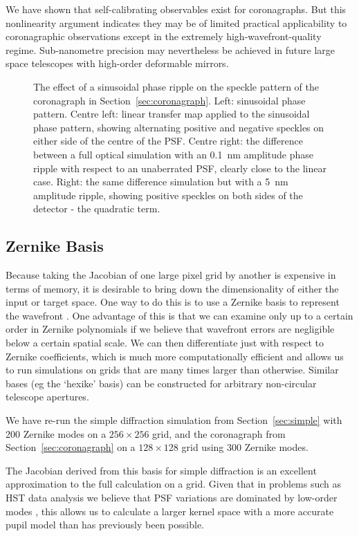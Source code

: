 \documentclass[modern]{aastex63}
\begin{document}
We have shown that self-calibrating observables exist for coronagraphs. But this nonlinearity argument indicates they may be of limited practical applicability to coronagraphic observations except in the extremely high-wavefront-quality regime. Sub-nanometre precision may nevertheless be achieved in future large space telescopes with high-order deformable mirrors.


\begin{figure}
\caption{The effect of a sinusoidal phase ripple on the speckle pattern of the coronagraph in Section~\ref{sec:coronagraph}. Left: sinusoidal phase pattern. Centre left: linear transfer map applied to the sinusoidal phase pattern, showing alternating positive and negative speckles on either side of the centre of the PSF. Centre right: the difference between a full optical simulation with an 0.1~nm amplitude phase ripple with respect to an unaberrated PSF, clearly close to the linear case. Right: the same difference simulation but with a 5~nm amplitude ripple, showing positive speckles on both sides of the detector - the quadratic term. \label{corona_nonlinearity}}
\end{figure}

\subsection{Zernike Basis}
\label{zernike}

Because taking the Jacobian of one large pixel grid by another is expensive in terms of memory, it is desirable to bring down the dimensionality of either the input or target space. One way to do this is to use a Zernike basis to represent the wavefront \citep{zernike34}. One advantage of this is that we can examine only up to a certain order in Zernike polynomials if we believe that wavefront errors are negligible below a certain spatial scale. We can then differentiate just with respect to Zernike coefficients, which is much more computationally efficient and allows us to run simulations on grids that are many times larger than otherwise. Similar bases (eg the `hexike' basis) can be constructed for arbitrary non-circular telescope apertures.

We have re-run the simple diffraction simulation from Section~\ref{sec:simple} with 200 Zernike modes on a $256\times256$ grid, and the coronagraph from Section~\ref{sec:coronagraph} on a $128\times128$ grid using 300 Zernike modes. 

The Jacobian derived from this basis for simple diffraction is an excellent approximation to the full calculation on a grid. Given that in problems such as HST data analysis we believe that PSF variations are dominated by low-order modes \citep{pope13}, this allows us to calculate a larger kernel space with a more accurate pupil model than has previously been possible. 
\end{document}
